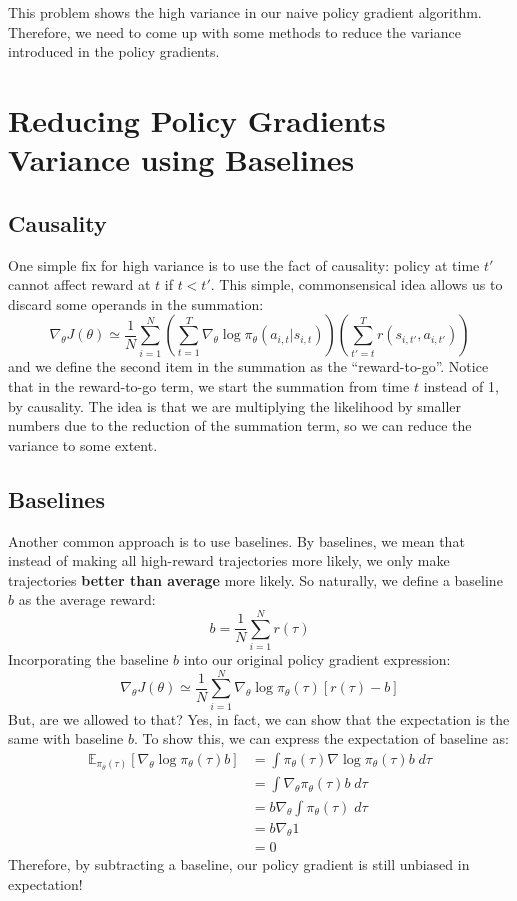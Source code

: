 This problem shows the high variance in our naive policy gradient algorithm. Therefore, we need to come up with some methods to reduce the variance introduced in the policy gradients. 
\section{Reducing Policy Gradients Variance using Baselines}
\subsection{Causality}
One simple fix for high variance is to use the fact of causality: policy at time $t'$ cannot affect reward at $t$ if $t<t'$. This simple, commonsensical idea allows us to discard some operands in the summation:
$$\nabla_\theta J(\theta) \simeq \frac{1}{N}\sum_{i=1}^N\left(\sum_{t=1}^T\nabla_\theta \log\pi_\theta(a_{i,t}|s_{i,t})\right)\left(\sum_{t'=t}^T r(s_{i,t'},a_{i,t'})\right)$$
and we define the second item in the summation as the ``reward-to-go''. Notice that in the reward-to-go term, we start the summation from time $t$ instead of 1, by causality. The idea is that we are multiplying the likelihood by smaller numbers due to the reduction of the summation term, so we can reduce the variance to some extent.
\subsection{Baselines}
Another common approach is to use baselines. By baselines, we mean that instead of making all high-reward trajectories more likely, we only make trajectories \textbf{better than average} more likely. So naturally, we define a baseline $b$ as the average reward:
$$b = \frac{1}{N} \sum_{i=1}^Nr(\tau)$$
Incorporating the baseline $b$ into our original policy gradient expression:
$$\nabla_\theta J(\theta) \simeq \frac{1}{N}\sum_{i=1}^N \nabla_\theta \log\pi_\theta(\tau)\left[r(\tau)-b\right]$$
But, are we allowed to that? Yes, in fact, we can show that the expectation is the same with baseline $b$. To show this, we can express the expectation of baseline as:
\begin{align*}
\mathbb{E}_{\pi_\theta(\tau)}\left[\nabla_\theta\log \pi_\theta(\tau)b\right]&=
\int \pi_\theta(\tau)\nabla \log\pi_\theta(\tau)b\;d\tau\\
&=\int \nabla_\theta \pi_\theta(\tau)b\;d\tau\\
&=b\nabla_\theta\int\pi_\theta(\tau)\;d\tau\\
&=b\nabla_\theta 1\\
&=0
\end{align*}
Therefore, by subtracting a baseline, our policy gradient is still unbiased in expectation!
